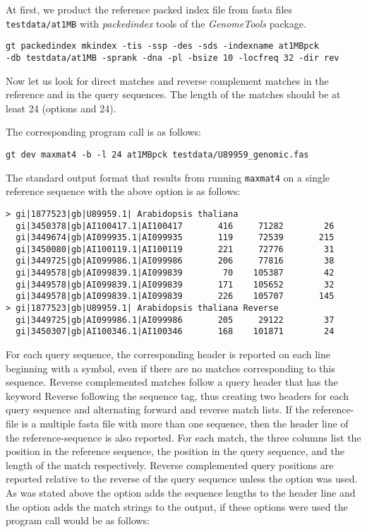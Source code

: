 \documentclass[12pt]{article}
\newcommand{\MMFour}{\texttt{maxmat4}\xspace}
\newcommand{\GenomeTools}{\textit{GenomeTools}\xspace}
\newcommand{\packedindex}{\textit{packedindex}\xspace}
\begin{document}
At first, we product the reference packed index file from 
fasta files \texttt{testdata/at1MB} with 
\packedindex tools of the \GenomeTools package\cite{packedindexmanual}.

\begin{verbatim}
gt packedindex mkindex -tis -ssp -des -sds -indexname at1MBpck
-db testdata/at1MB -sprank -dna -pl -bsize 10 -locfreq 32 -dir rev 
\end{verbatim}

Now let us look for direct matches and reverse complement
matches in the reference and in the query sequences.
The length of the matches should be at least 24 (options  
and  24). 

The corresponding program call is as follows:

\begin{verbatim}
gt dev maxmat4 -b -l 24 at1MBpck testdata/U89959_genomic.fas
\end{verbatim}

The standard output format that results from running \MMFour 
on a single reference sequence with the above option is as follows:

\begin{small}
\begin{verbatim}
> gi|1877523|gb|U89959.1| Arabidopsis thaliana
  gi|3450378|gb|AI100417.1|AI100417       416     71282        26
  gi|3449674|gb|AI099935.1|AI099935       119     72539       215
  gi|3450080|gb|AI100119.1|AI100119       221     72776        31
  gi|3449725|gb|AI099986.1|AI099986       206     77816        38
  gi|3449578|gb|AI099839.1|AI099839        70    105387        42
  gi|3449578|gb|AI099839.1|AI099839       171    105652        32
  gi|3449578|gb|AI099839.1|AI099839       226    105707       145
> gi|1877523|gb|U89959.1| Arabidopsis thaliana Reverse
  gi|3449725|gb|AI099986.1|AI099986       205     29122        37
  gi|3450307|gb|AI100346.1|AI100346       168    101871        24
\end{verbatim}
\end{small}

For each query sequence, the corresponding header is reported on each line 
beginning with a \texttt{} symbol, even if there are no matches corresponding to this sequence. 
Reverse complemented matches follow a query header that has the keyword Reverse 
following the sequence tag, thus creating two headers for each query sequence and 
alternating forward and reverse match lists. 
If the reference-file is a multiple fasta file with more than one sequence,
then the header line of the reference-sequence is also reported.
For each match, the three columns list the position in the reference sequence, 
the position in the query sequence, and the length of the match respectively. 
Reverse complemented query positions are reported relative to the reverse 
of the query sequence unless the  option was used. 
As was stated above the  option adds the sequence lengths to the header line 
and the  option adds the match strings to the output, if these options 
were used the program call would be as follows:
\end{document}

